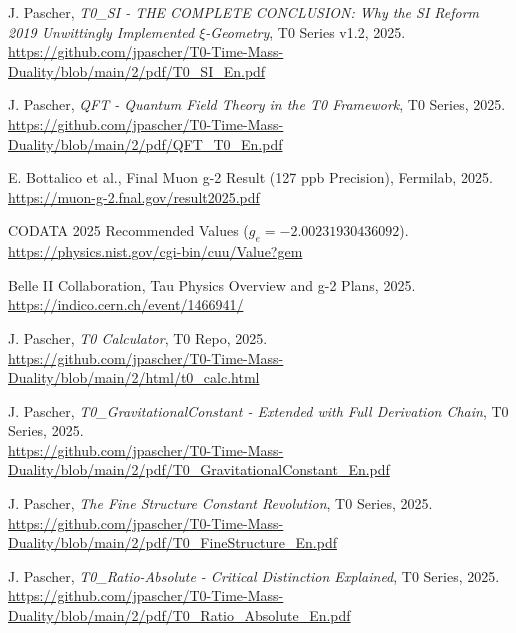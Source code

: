 \documentclass[12pt,a4paper]{article}
\begin{document}
	
	\begin{thebibliography}{99}
		 J. Pascher, \textit{T0\_SI - THE COMPLETE CONCLUSION: Why the SI Reform 2019 Unwittingly Implemented $\xi$-Geometry}, T0 Series v1.2, 2025. \\
		\url{https://github.com/jpascher/T0-Time-Mass-Duality/blob/main/2/pdf/T0_SI_En.pdf}
		
		 J. Pascher, \textit{QFT - Quantum Field Theory in the T0 Framework}, T0 Series, 2025. \\
		\url{https://github.com/jpascher/T0-Time-Mass-Duality/blob/main/2/pdf/QFT_T0_En.pdf}
		
		 E. Bottalico et al., Final Muon g-2 Result (127 ppb Precision), Fermilab, 2025. \\
		\url{https://muon-g-2.fnal.gov/result2025.pdf}
		
		 CODATA 2025 Recommended Values ($g_e = -2.00231930436092$). \\
		\url{https://physics.nist.gov/cgi-bin/cuu/Value?gem}
		
		 Belle II Collaboration, Tau Physics Overview and g-2 Plans, 2025. \\
		\url{https://indico.cern.ch/event/1466941/}
		
		 J. Pascher, \textit{T0 Calculator}, T0 Repo, 2025. \\
		\url{https://github.com/jpascher/T0-Time-Mass-Duality/blob/main/2/html/t0_calc.html}
		
		 J. Pascher, \textit{T0\_GravitationalConstant - Extended with Full Derivation Chain}, T0 Series, 2025. \\
		\url{https://github.com/jpascher/T0-Time-Mass-Duality/blob/main/2/pdf/T0_GravitationalConstant_En.pdf}
		
		 J. Pascher, \textit{The Fine Structure Constant Revolution}, T0 Series, 2025. \\
		\url{https://github.com/jpascher/T0-Time-Mass-Duality/blob/main/2/pdf/T0_FineStructure_En.pdf}
		
		 J. Pascher, \textit{T0\_Ratio-Absolute - Critical Distinction Explained}, T0 Series, 2025. \\
		\url{https://github.com/jpascher/T0-Time-Mass-Duality/blob/main/2/pdf/T0_Ratio_Absolute_En.pdf}
		

\end{thebibliography}
\end{document}
